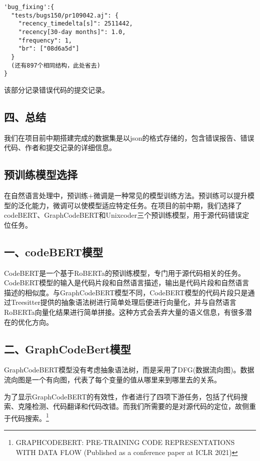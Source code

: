 \documentclass[12pt]{article}
\begin{document}
\begin{lstlisting}
'bug_fixing':{
  "tests/bugs150/pr109042.aj": {
    "recency_timedelta[s]": 2511442,
    "recency[30-day months]": 1.0,
    "frequency": 1,
    "br": ["08d6a5d"]
  }
  (还有897个相同结构，此处省去)
}
\end{lstlisting}

该部分记录错误代码的提交记录。

\subsection*{四、总结}

我们在项目前中期搭建完成的数据集是以json的格式存储的，包含错误报告、错误代码、作者和提交记录的详细信息。

\subsection{预训练模型选择}

在自然语言处理中，预训练+微调是一种常见的模型训练方法。预训练可以提升模型的泛化能力，微调可以使模型适应特定任务。在项目的前中期，我们选择了codeBERT、GraphCodeBERT和Unixcoder三个预训练模型，用于源代码错误定位任务。

\subsection*{一、codeBERT模型}

CodeBERT是一个基于RoBERTa的预训练模型，专门用于源代码相关的任务。CodeBERT模型的输入是代码片段和自然语言描述，输出是代码片段和自然语言描述的相似度。与GraphCodeBERT模型不同，CodeBERT模型的代码片段只是通过Treesitter提供的抽象语法树进行简单处理后便进行向量化，并与自然语言RoBERTa向量化结果进行简单拼接。这种方式会丢弃大量的语义信息，有很多潜在的优化方向。

\subsection*{二、GraphCodeBert模型}

GraphCodeBERT模型没有考虑抽象语法树，而是采用了DFG(数据流向图)。数据流向图是一个有向图，代表了每个变量的值从哪里来到哪里去的关系。

为了显示GraphCodeBERT的有效性，作者进行了四项下游任务，包括了代码搜索、克隆检测、代码翻译和代码改错。而我们所需要的是对源代码的定位，故侧重于代码搜索。\footnote{GRAPHCODEBERT:
      PRE-TRAINING CODE REPRESENTATIONS WITH DATA FLOW (Published as a
      conference paper at ICLR 2021)}
\end{document}
